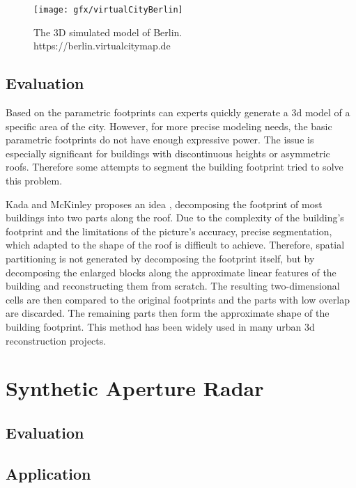 \begin{figure}[htb]
	\centering
	\texttt{[image: gfx/virtualCityBerlin]}  	  	 	
	\caption{The 3D simulated model of Berlin.
		\\https://berlin.virtualcitymap.de}
	\label{fig:berlin}
\end{figure}


\subsection{Evaluation}

Based on the parametric footprints can experts quickly generate a 3d model of a specific area of the city. However, for more precise modeling needs, the basic parametric footprints do not have enough expressive power. The issue is especially significant for buildings with discontinuous heights or asymmetric roofs. Therefore some attempts to segment the building footprint tried to solve this problem.

Kada and McKinley proposes an idea \cite{kada20093d}, decomposing the footprint of most buildings into two parts along the roof. Due to the complexity of the building's footprint and the limitations of the picture's accuracy, precise segmentation, which adapted to the shape of the roof is difficult to achieve. Therefore, spatial partitioning is not generated by decomposing the footprint itself, but by decomposing the enlarged blocks along the approximate linear features of the building and reconstructing them from scratch. The resulting two-dimensional cells are then compared to the original footprints and the parts with low overlap are discarded. The remaining parts then form the approximate shape of the building footprint. This method has been widely used in many urban 3d reconstruction projects.



\section{Synthetic Aperture Radar}

\subsection{Evaluation}

\subsection{Application}

